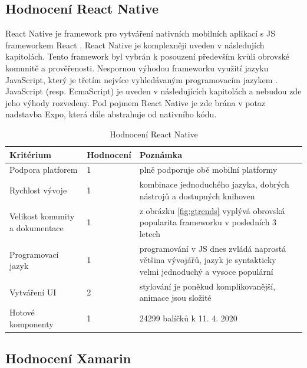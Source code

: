 \subsection{Hodnocení React Native}

React Native je framework pro vytváření nativních mobilních aplikací s JS frameworkem React \cite{novick2017react}. React Native je komplexněji uveden v následujích kapitolách. Tento framework byl vybrán k posouzení především kvůli obrovské komunitě a prověřenosti. Nespornou výhodou frameworku využití jazyku JavaScript, který je třetím nejvíce vyhledávaným programovacím jazykem \cite{Carbonnelle2020}. JavaScript (resp. EcmaScript) je uveden v následujících kapitolách a nebudou zde jeho výhody rozvedeny. Pod pojmem React Native je zde brána v potaz nadstavba Expo, která dále abstrahuje od nativního kódu.

\begin{table}[H]
	\begin{tabularx}{\textwidth}{| X | X | X |}
		\hline
		Kritérium                       & Hodnocení & Poznámka \\
		\hline
		Podpora platforem  & 1  & plně podporuje obě mobilní platformy \\
		\hline
		Rychlost vývoje                 & 1 & kombinace jednoduchého jazyka, dobrých nástrojů a dostupných knihoven \\
		\hline
		Velikost komunity a dokumentace & 1  & z obrázku \ref{fig:gtrends} vyplývá obrovská popularita frameworku v posledních 3 letech \\
		\hline
		Programovací jazyk              & 1 & programování v JS dnes zvládá naprostá většina vývojářů, jazyk je syntakticky velmi jednoduchý a vysoce populární         \\
		\hline
		Vytváření UI                    & 2 & stylování je poněkud komplikovanější, animace jsou složité         \\
		\hline
		Hotové komponenty               & 1 & 24299 balíčků k 11. 4. 2020  \\
		\hline
	\end{tabularx}
	\caption{Hodnocení React Native}
\end{table}

\subsection{Hodnocení Xamarin}


